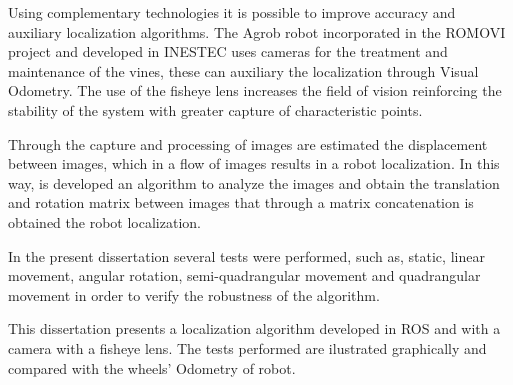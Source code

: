 Using complementary technologies it is possible to improve accuracy and auxiliary localization algorithms. The Agrob robot incorporated in the ROMOVI project and developed in INESTEC uses cameras for the treatment and maintenance of the vines, these can auxiliary the localization through Visual Odometry.  The use of the fisheye lens increases the field of vision reinforcing the stability of the system with greater capture of characteristic points.

Through the capture and processing of images are estimated the displacement between images, which in a flow of images results in a robot localization. In this way, is developed an algorithm to analyze the images and obtain the translation and rotation matrix between images that through a matrix concatenation is obtained the robot localization.

In the present dissertation several tests were performed, such as, static, linear movement, angular rotation, semi-quadrangular movement and quadrangular movement in order to verify the robustness of the algorithm.


This dissertation presents a localization algorithm developed in ROS and with a camera with a fisheye lens. The tests performed are ilustrated graphically  and compared with the wheels' Odometry of robot.